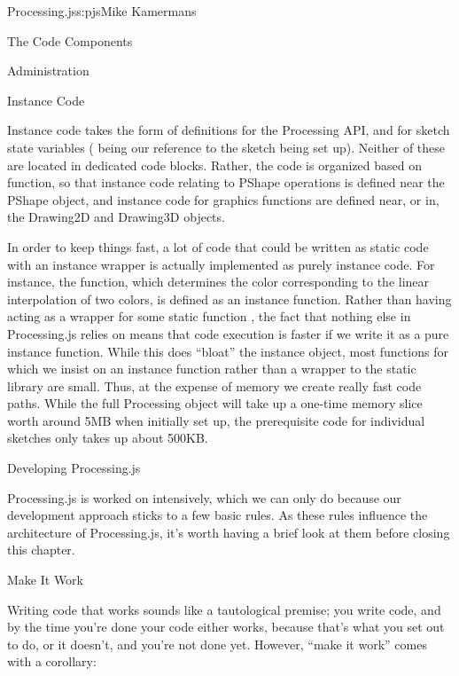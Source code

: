 \begin{aosachapter}{Processing.js}{s:pjs}{Mike Kamermans}
\begin{aosasect1}{The Code Components}
\begin{aosasect2}{Administration}
\begin{aosasect3}{Instance Code}

Instance code takes the form of 
definitions for the Processing API, and  for sketch
state variables ( being our reference to the sketch being set
up). Neither of these are located in dedicated code blocks. Rather,
the code is organized based on function, so that instance code
relating to PShape operations is defined near the PShape object, and
instance code for graphics functions are defined near, or in, the
Drawing2D and Drawing3D objects.

In order to keep things fast, a lot of code that could be written as
static code with an instance wrapper is actually implemented as purely
instance code. For instance, the  function,
which determines the color corresponding to the linear interpolation
of two colors, is defined as an instance function. Rather than having
 acting as a wrapper for some static function
, the fact that nothing else in
Processing.js relies on  means that code execution is
faster if we write it as a pure instance function. While this does
``bloat'' the instance object, most functions for which we insist on an
instance function rather than a wrapper to the static library are
small. Thus, at the expense of memory we create really fast code
paths. While the full Processing object will take up a one-time memory
slice worth around 5MB when initially set up, the prerequisite code
for individual sketches only takes up about 500KB.

\end{aosasect3}

\end{aosasect2}

\end{aosasect1}

\begin{aosasect1}{Developing Processing.js}

Processing.js is worked on intensively, which we can only do because
our development approach sticks to a few basic rules. As these rules
influence the architecture of Processing.js, it's worth having a brief
look at them before closing this chapter.

\begin{aosasect2}{Make It Work}

Writing code that works sounds like a tautological premise; you write
code, and by the time you're done your code either works, because
that's what you set out to do, or it doesn't, and you're not done
yet. However, ``make it work'' comes with a corollary:


\end{aosasect2}
\end{aosasect1}
\end{aosachapter}
